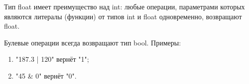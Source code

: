 \documentclass[../Language-declaration.tex]{subfiles}
\begin{document}
           Тип float имеет преимущество над int: любые операции, параметрами которых являются литералы (функции) от типов int и float одновременно, возвращают float.\newline

           Булевые операции всегда возвращают тип bool. Примеры:
           \begin{enumerate}
            \item "187.3 | 120" вернёт "1";
            \item "45 \& 0" вернёт "0".
           \end{enumerate}
\end{document}
